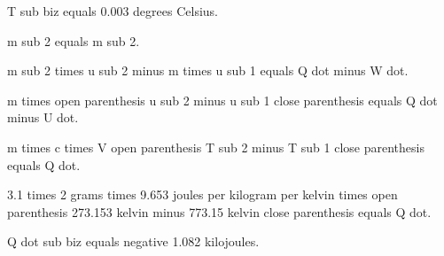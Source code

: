 T sub biz equals 0.003 degrees Celsius.

m sub 2 equals m sub 2.

m sub 2 times u sub 2 minus m times u sub 1 equals Q dot minus W dot.

m times open parenthesis u sub 2 minus u sub 1 close parenthesis equals Q dot minus U dot.

m times c times V open parenthesis T sub 2 minus T sub 1 close parenthesis equals Q dot.

3.1 times 2 grams times 9.653 joules per kilogram per kelvin times open parenthesis 273.153 kelvin minus 773.15 kelvin close parenthesis equals Q dot.

Q dot sub biz equals negative 1.082 kilojoules.